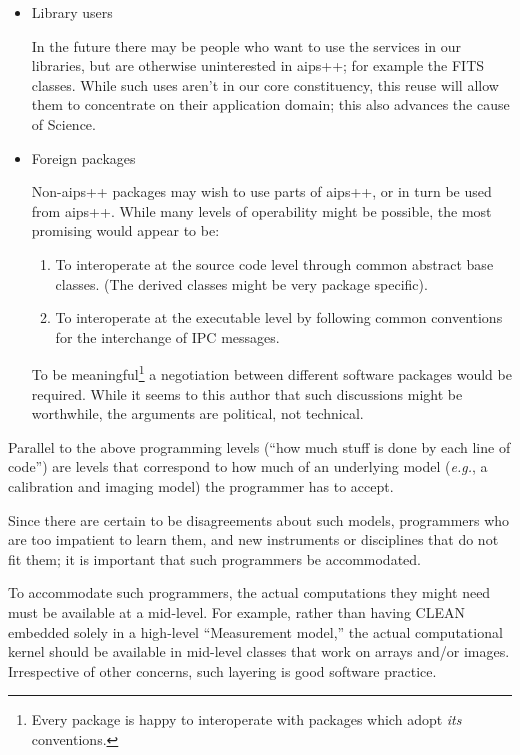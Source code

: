 \begin{itemize}
\item Library users

      In the future there may be people who want to use the services
      in our libraries, but are otherwise uninterested in {\sc aips++}; for
      example the FITS classes. While such uses aren't in our core
      constituency, this reuse will allow them to concentrate on their
      application domain; this also advances the cause of Science.

\item Foreign packages

	Non-{\sc aips++} packages may wish to use parts of {\sc
	aips++}, or in turn be used from {\sc aips++}. While many levels of
	operability might be possible, the most promising would appear
	to be:
\begin{enumerate}
    \item To interoperate at the source code level through common
	abstract base classes. (The derived classes might be very
	package specific).
    \item To interoperate at the executable level by following common
	conventions for the interchange of IPC messages.
\end{enumerate}
	To be meaningful\footnote{Every package is happy to
	interoperate with packages which adopt {\em its} conventions.}
	a negotiation between different software packages would be
	required. While it seems to this author that such discussions
	might be worthwhile, the arguments are political, not technical.
\end{itemize}


Parallel to the above programming levels (``how much stuff is done by
each line of code'') are levels that correspond to how much of an
underlying model ({\em e.g.}, a calibration and imaging model) the programmer
has to accept.

Since there are certain to be disagreements about such models,
programmers who are too impatient to learn them, and new instruments
or disciplines that do not fit them; it is important that such
programmers be accommodated. 

To accommodate such programmers, the actual computations they might
need must be available at a mid-level. For example, rather than having
CLEAN embedded solely in a high-level ``Measurement model,'' the
actual computational kernel should be available in mid-level classes
that work  on arrays and/or images. Irrespective of other concerns,
such layering is good software practice.


